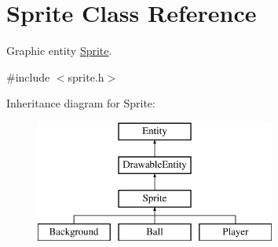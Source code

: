 \hypertarget{class_sprite}{}\section{Sprite Class Reference}
\label{class_sprite}


Graphic entity \hyperlink{class_sprite}{Sprite}.  




{\ttfamily \#include $<$sprite.\+h$>$}

Inheritance diagram for Sprite\+:\begin{figure}[H]
\begin{center}
\leavevmode
\includegraphics[height=4.000000cm]{class_sprite}
\end{center}
\end{figure}
